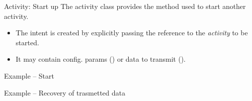 \documentclass{beamer}
\begin{document}
  \begin{frame}[fragile]{Activity: Start up}
    The activity class provides the  method used to start another activity.
    \begin{itemize}
      \item The intent is created by explicitly passing the reference to the \textit{activity} to be started.
      \item It may contain config. params () or data to transmit ().
    \end{itemize}
    \begin{exampleblock}{Example -- Start }
      
    \end{exampleblock}

    \begin{exampleblock}{Example -- Recovery of trasmetted data}
      
    \end{exampleblock}
  \end{frame}
\end{document}
